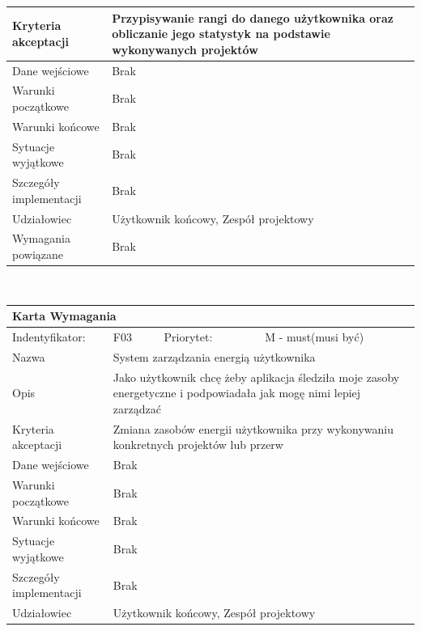 \documentclass[a4paper,11pt]{report}
\begin{document}
\begin{itemize}
\begin{tabular}{|p{3cm}|p{2cm}|p{2cm}|p{6cm}|}
		\hline
		Kryteria akceptacji & \multicolumn{3}{|p{10 cm}|}{Przypisywanie rangi do danego użytkownika oraz obliczanie jego statystyk na podstawie wykonywanych projektów}\\
		\hline
		Dane wejściowe & \multicolumn{3}{|p{10 cm}|}{Brak}\\
		\hline
		Warunki początkowe & \multicolumn{3}{|p{10 cm}|}{Brak}\\
		\hline
		Warunki końcowe & \multicolumn{3}{|p{10 cm}|}{Brak}\\
		\hline
		Sytuacje wyjątkowe & \multicolumn{3}{|p{10 cm}|}{Brak}\\
		\hline
		Szczegóły implementacji & \multicolumn{3}{|p{10 cm}|}{Brak}\\
		\hline
		Udziałowiec & \multicolumn{3}{|p{10 cm}|}{Użytkownik końcowy, Zespół projektowy}\\
		\hline
		Wymagania powiązane & \multicolumn{3}{|p{10 cm}|}{Brak}\\
		\hline
		\end{tabular}\\
		\begin{tabular}{|p{3cm}|p{2cm}|p{2cm}|p{6cm}|}
		\hline
		\multicolumn{4}{|p{12 cm}|}{Karta Wymagania}\\
		\hline
		Indentyfikator: & F03 & Priorytet: & M - must(musi być)\\
		\hline
		Nazwa & \multicolumn{3}{|p{10 cm}|}{System zarządzania energią  użytkownika}\\
		\hline
		Opis & \multicolumn{3}{|p{10 cm}|}{Jako użytkownik chcę żeby aplikacja śledziła moje zasoby energetyczne i podpowiadała jak mogę nimi lepiej zarządzać}\\
		\hline
		Kryteria akceptacji & \multicolumn{3}{|p{10 cm}|}{Zmiana zasobów energii użytkownika przy wykonywaniu konkretnych projektów lub przerw}\\
		\hline
		Dane wejściowe & \multicolumn{3}{|p{10 cm}|}{Brak}\\
		\hline
		Warunki początkowe & \multicolumn{3}{|p{10 cm}|}{Brak}\\
		\hline
		Warunki końcowe & \multicolumn{3}{|p{10 cm}|}{Brak}\\
		\hline
		Sytuacje wyjątkowe & \multicolumn{3}{|p{10 cm}|}{Brak}\\
		\hline
		Szczegóły implementacji & \multicolumn{3}{|p{10 cm}|}{Brak}\\
		\hline
		Udziałowiec & \multicolumn{3}{|p{10 cm}|}{Użytkownik końcowy, Zespół projektowy}\\
		\hline

\end{tabular}
\end{itemize}
\end{document}
